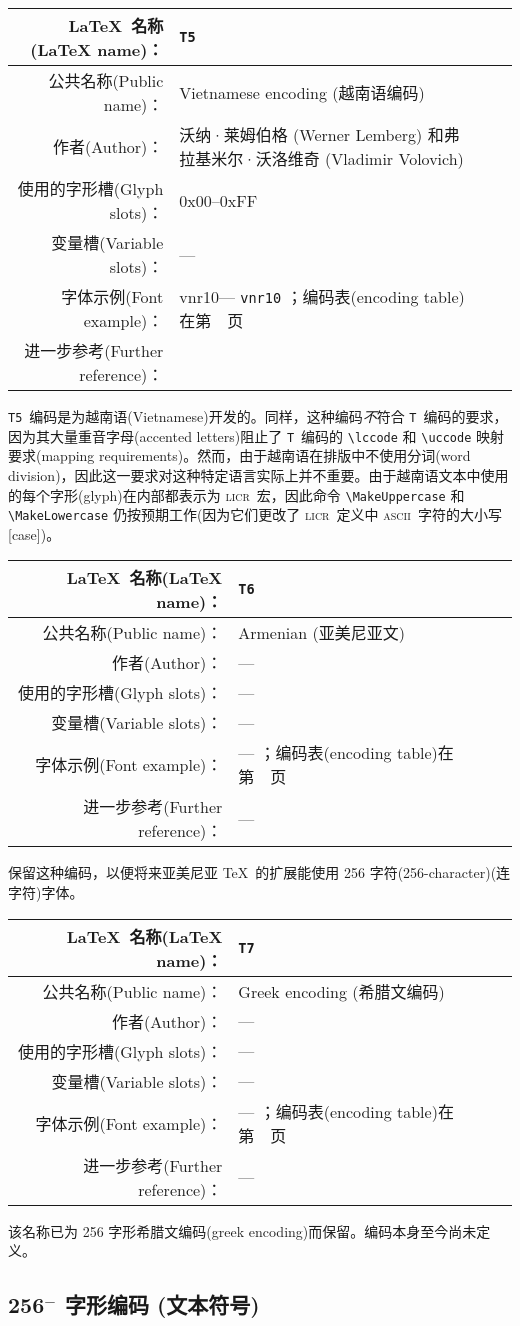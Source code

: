 \documentclass{ltxguide}[1994/11/20]
\makeatletter
\providecommand{\Enc}[1]{\texttt{#1}}
\newenvironment{encodinginfo}[7]%
  {\noindent
   \begin{tabularx}{1.11\textwidth}{|rX|lX|}%
     \hline
     \LaTeX{}\ 名称(\LaTeX{} name)：          & \texttt{#1}\\\hline%
     公共名称(Public name)：          & #2\\\hline%
     作者(Author)：                   & #3\\\hline%
     使用的字形槽(Glyph slots)：& #4\\\hline%
     变量槽(Variable slots)：& #5\\\hline%
     字体示例(Font example)：& \def\@tempa{#6}\ifx\@tempa\@empty---%
                            \else\texttt{#6}\referenceftable{#6}\fi\\\hline%
     进一步参考(Further reference)： & #7\\\hline%
   \end{tabularx}%
   \par\nobreak
   \vspace*{3pt}%
   \quote
  }%
  {\endquote
   \vspace{6pt}}
\def\referenceftable#1{
  \@ifundefined{r@fonttable:#1}%
  \relax
  {；\space 编码表(encoding table)在第~\pageref{fonttable:#1}~页}%
}
\makeatother
\begin{document}
\begin{encodinginfo}{T5}
        {Vietnamese encoding (越南语编码)}
        {沃纳·莱姆伯格 (Werner Lemberg) 和弗拉基米尔·沃洛维奇 (Vladimir Volovich)}
        {0x00--0xFF}
        {---}
        {vnr10}
        {\cite{vnr}}

  \Enc{T5}\ 编码是为越南语(Vietnamese)开发的。同样，这种编码\emph{不}符合 \Enc{T}\ 编码的要求，因为其大量重音字母(accented letters)阻止了 \Enc{T}\ 编码的 \verb=\lccode= 和 \verb=\uccode= 映射要求(mapping requirements)。然而，由于越南语在排版中不使用分词(word division)，因此这一要求对这种特定语言实际上并不重要。由于越南语文本中使用的每个字形(glyph)在内部都表示为 \textsc{licr}\ 宏，因此命令 \verb=\MakeUppercase= 和 \verb=\MakeLowercase= 仍按预期工作(因为它们更改了 \textsc{licr}\ 定义中 \textsc{ascii}\ 字符的大小写[case])。

\end{encodinginfo}

\begin{encodinginfo}
  {T6}
  {Armenian (亚美尼亚文)}
  {---}
  {---}
  {---}
  {}
  {---}

  保留这种编码，以便将来亚美尼亚 \TeX{}\ 的扩展能使用 256 字符(256-character)(连字符)字体。
\end{encodinginfo}

\begin{encodinginfo}{T7}
        {Greek encoding (希腊文编码)}
   {---}
   {---}
   {---}
   {}
   {---}

该名称已为 256 字形希腊文编码(greek encoding)而保留。编码本身至今尚未定义。

\end{encodinginfo}



\subsection{256$^-$ 字形编码 (文本符号)}
\end{document}
